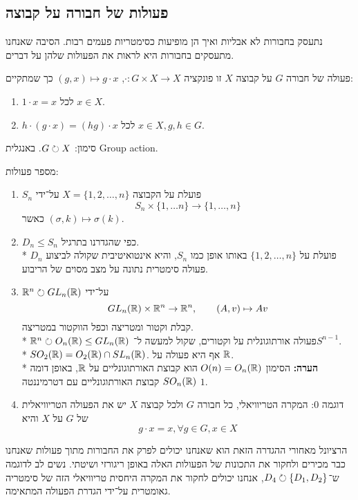 \subsection{פעולות של חבורה על קבוצה}
נתעסק בחבורות לא אבליות ואיך הן מופיעות כסימטריות פעמים רבות.
הסיבה שאנחנו מתעסקים בחבורות היא לראות את הפעולות שלהן על דברים.
\begin{definition}[פעולה]
	פעולה של חבורה $G$ על קבוצה $X$ זו פונקציה $\cdot : G \times X \to X$, $(g, x) \mapsto g \cdot x$ כך שמתקיים:
	\begin{enumerate}
		\item $1 \cdot x = x$ לכל $x \in X$.
		\item $h \cdot (g \cdot x) = (hg) \cdot x$ לכל $x \in X, g, h \in G$.
	\end{enumerate}
	סימון: $G \circlearrowright X$. באנגלית Group action.
\end{definition}
\begin{example}[לפעולות]
	מספר פעולות:
	\begin{enumerate}
		\item $S_n$ פועלת על הקבוצה $X = \{1, 2, \hdots, n\}$ על־ידי
			\[
				S_n \times \{1, \hdots n\} \to \{1, \hdots, n\}
			\]
			כאשר $(\sigma, k) \mapsto \sigma(k)$.
		\item $D_n \le S_n$ כפי שהגדרנו בתרגיל. \\*
			$D_n$ פועלת על $\{1, 2, \hdots, n \}$ באותו אופן כמו $S_n$, והיא אינטואיטיבית שקולה לביצוע פעולה סימטרית נתונה על מצב מסוים של הריבוע.
		\item $\mathbb{R}^n \circlearrowright GL_n(\mathbb{R})$ על־ידי
			\[
				GL_n(\mathbb{R}) \times \mathbb{R}^n \to \mathbb{R}^n, \qquad (A, v) \mapsto Av
			\]
			קבלת וקטור ומטריצה וכפל הווקטור במטריצה. \\*
			$\mathbb{R}^n \circlearrowright O_n(\mathbb{R}) \le GL_n(\mathbb{R})$ פעולה אורתוגונלית על וקטורים, שקול למעשה ל־$S^{n - 1}$. \\*
			$SO_2(\mathbb{R}) = O_2(\mathbb{R}) \cap SL_n(\mathbb{R})$. אף היא פעולה על $\mathbb{R}$. \\*
			\textbf{הערה:} הסימון $O(n) = O_n(\mathbb{R})$ הוא קבוצת האורתוגונליים על $\mathbb{R}$, באופן דומה $SO_n(\mathbb{R})$ קבוצת האורתוגונליים עם דטרמיננטה $1$.
		\item דוגמה 0: המקרה הטריוויאלי, כל חבורה $G$ ולכל קבוצה $X$ יש את הפעולה הטריוויאלית של $G$ על $X$ והיא
			\[
				g \cdot x = x, \forall g \in G, x \in X
			\]
	\end{enumerate}
\end{example}

הרציונל מאחורי ההגדרה הזאת הוא שאנחנו יכולים לפרק את החבורות מתוך פעולות שאנחנו כבר מכירים ולחקור את התכונות של הפעולות האלה באופן ריגורזי ושיטתי.
נשים לב לדוגמה ש־$D_4 \circlearrowright \{ D_1, D_2 \}$, אנחנו יכולים לחקור את המקרה היחסית טריוויאלי הזה של סימטריה גאומטרית על־ידי הגדרת הפעולה המתאימה.

